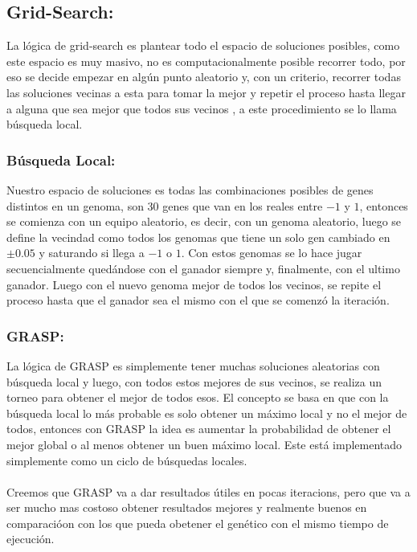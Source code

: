 \subsection{Grid-Search:}

La lógica de grid-search es plantear todo el espacio de soluciones posibles, como este espacio
es muy masivo, no es computacionalmente posible recorrer todo, por eso se decide empezar
en algún punto aleatorio y, con un criterio, recorrer todas las soluciones vecinas a esta
para tomar la mejor y repetir el proceso hasta llegar a alguna que sea mejor que todos sus vecinos
, a este procedimiento se lo llama búsqueda local.


\subsubsection{Búsqueda Local:}


Nuestro espacio de soluciones es todas las combinaciones posibles de genes distintos en un genoma,
son 30 genes que van en los reales entre $-1$ y $1$, entonces se comienza con un equipo aleatorio,
es decir, con un genoma aleatorio, luego se define la vecindad como todos los genomas que tiene
un solo gen cambiado en $\pm 0.05$ y saturando si llega a $-1$ o $1$. Con estos genomas se lo hace
jugar secuencialmente quedándose con el ganador siempre y, finalmente, con el ultimo ganador.
Luego con el nuevo genoma mejor de todos los vecinos, se repite el proceso hasta que el ganador
sea el mismo con el que se comenzó la iteración.


\subsubsection{GRASP:}


La lógica de GRASP es simplemente tener muchas soluciones aleatorias con búsqueda local y luego, con todos
estos mejores de sus vecinos, se realiza un torneo para obtener el mejor de todos esos.
El concepto se basa en que con la búsqueda local lo más probable es solo obtener un máximo local y no
el mejor de todos, entonces con GRASP la idea es aumentar la probabilidad de obtener el mejor global o
al menos obtener un buen máximo local.
Este está implementado simplemente como un ciclo de búsquedas locales.
\\
\\

Creemos que GRASP va a dar resultados útiles en pocas iteracions, pero que va
a ser mucho mas costoso obtener resultados mejores y realmente buenos en comparacióon
con los que pueda obetener el genético con el mismo tiempo de ejecución.
